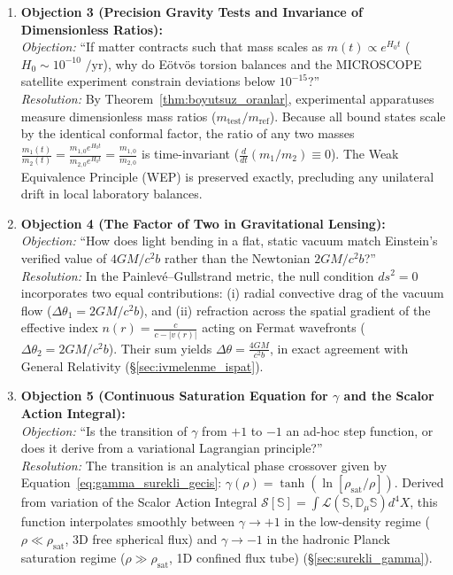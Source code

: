 \begin{enumerate}
    \item \textbf{Objection 3 (Precision Gravity Tests and Invariance of Dimensionless Ratios):} \\
          \textit{Objection:} ``If matter contracts such that mass scales as $m(t) \propto e^{H_0 t}$ ($H_0 \sim 10^{-10}\text{ /yr}$), why do Eötvös torsion balances and the MICROSCOPE satellite experiment constrain deviations below $10^{-15}$?'' \\
          \textit{Resolution:} By Theorem~\ref{thm:boyutsuz_oranlar}, experimental apparatuses measure dimensionless mass ratios ($m_{\mathrm{test}}/m_{\mathrm{ref}}$). Because all bound states scale by the identical conformal factor, the ratio of any two masses $\frac{m_1(t)}{m_2(t)} = \frac{m_{1,0} e^{H_0 t}}{m_{2,0} e^{H_0 t}} = \frac{m_{1,0}}{m_{2,0}}$ is time-invariant ($\frac{d}{dt}(m_1/m_2) \equiv 0$). The Weak Equivalence Principle (WEP) is preserved exactly, precluding any unilateral drift in local laboratory balances.

    \item \textbf{Objection 4 (The Factor of Two in Gravitational Lensing):} \\
          \textit{Objection:} ``How does light bending in a flat, static vacuum match Einstein's verified value of $4GM/c^2 b$ rather than the Newtonian $2GM/c^2 b$?'' \\
          \textit{Resolution:} In the Painlev\'e--Gullstrand metric, the null condition $ds^2 = 0$ incorporates two equal contributions: (i) radial convective drag of the vacuum flow ($\Delta\theta_1 = 2GM/c^2 b$), and (ii) refraction across the spatial gradient of the effective index $n(r) = \frac{c}{c - |v(r)|}$ acting on Fermat wavefronts ($\Delta\theta_2 = 2GM/c^2 b$). Their sum yields $\Delta\theta = \frac{4GM}{c^2 b}$, in exact agreement with General Relativity (\S\ref{sec:ivmelenme_ispat}).

    \item \textbf{Objection 5 (Continuous Saturation Equation for $\gamma$ and the Scalor Action Integral):} \\
          \textit{Objection:} ``Is the transition of $\gamma$ from $+1$ to $-1$ an ad-hoc step function, or does it derive from a variational Lagrangian principle?'' \\
          \textit{Resolution:} The transition is an analytical phase crossover given by Equation~\eqref{eq:gamma_surekli_gecis}: $\gamma(\rho) = \tanh(\ln[\rho_{\mathrm{sat}}/\rho])$. Derived from variation of the Scalor Action Integral $\mathcal{S}[\mathbb{S}] = \int \mathcal{L}(\mathbb{S}, \mathbb{D}_\mu \mathbb{S}) d^4X$, this function interpolates smoothly between $\gamma \to +1$ in the low-density regime ($\rho \ll \rho_{\mathrm{sat}}$, 3D free spherical flux) and $\gamma \to -1$ in the hadronic Planck saturation regime ($\rho \gg \rho_{\mathrm{sat}}$, 1D confined flux tube) (\S\ref{sec:surekli_gamma}).


\end{enumerate}
